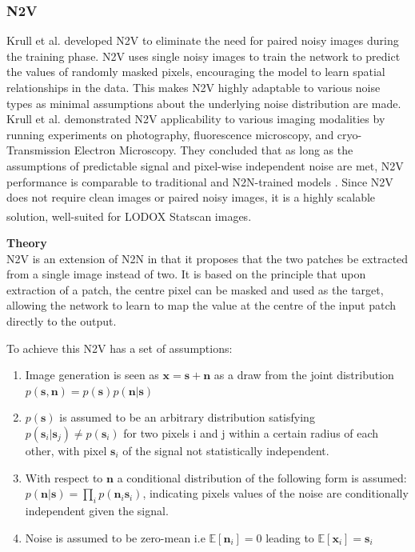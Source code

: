 \subsubsection*{\gls{N2V}}
Krull et al. \cite{8954066} developed \gls{N2V} to eliminate the need for paired noisy images during the training phase. \gls{N2V} uses single noisy images to train the network to predict the values of randomly masked pixels, encouraging the model to learn spatial relationships in the data. This makes \gls{N2V} highly adaptable to various noise types as minimal assumptions about the underlying noise distribution are made. Krull et al. \cite{8954066}  demonstrated \gls{N2V} applicability to various imaging modalities by running experiments on photography, fluorescence microscopy, and cryo-Transmission Electron Microscopy. They concluded that as long as the assumptions of predictable signal and pixel-wise independent noise are met, \gls{N2V} performance is comparable to traditional and \gls{N2N}-trained models \cite{8954066}. Since \gls{N2V} does not require clean images or paired noisy images, it is a highly scalable solution, well-suited for LODOX\textsuperscript{\textregistered} Statscan\textsuperscript{\textregistered} images.


\textbf{Theory} \\
\gls{N2V} is an extension of \gls{N2N} in that it proposes that the two patches be extracted from a single image instead of two.  It is based on the principle that upon extraction of a patch, the centre pixel can be masked and used as the target, allowing the network to learn to map the value at the centre of the input patch directly to the output. 

To achieve this \gls{N2V} has a set of assumptions:

\begin{enumerate}
	\item Image generation is seen as ${\mathbf{x}} = {\mathbf{s}}+ {\mathbf{n}}$ as a draw from the joint distribution $p({\mathbf{s}},{\mathbf{n}}) = p({\mathbf{s}})p({\mathbf{n}}|{\mathbf{s}})$
	\item $p({\mathbf{s}})$ is assumed to be an arbitrary distribution satisfying $p({{\mathbf{s}}_i}|{{\mathbf{s}}_j}) \ne p({{\mathbf{s}}_i})$ for two pixels i and j within a certain radius of each other, with pixel ${{\mathbf{s}}_i}$ of the signal not statistically independent. \label{it:second}
	\item With respect to ${\mathbf{n}}$ a conditional distribution of the following form is assumed: $p({\mathbf{n}}|{\mathbf{s}}) = \prod\limits_i {p({{\mathbf{n}}_i}{{\mathbf{s}}_i})} $, indicating pixels values of the noise are conditionally independent given the signal.
	\item Noise is assumed to be zero-mean i.e $\mathbb{E}[{{\mathbf{n}}_i}] = 0$ leading to $\mathbb{E}[{{\mathbf{x}}_i}] = {{\mathbf{s}}_i}$ \label{it:fourth}
\end{enumerate}

